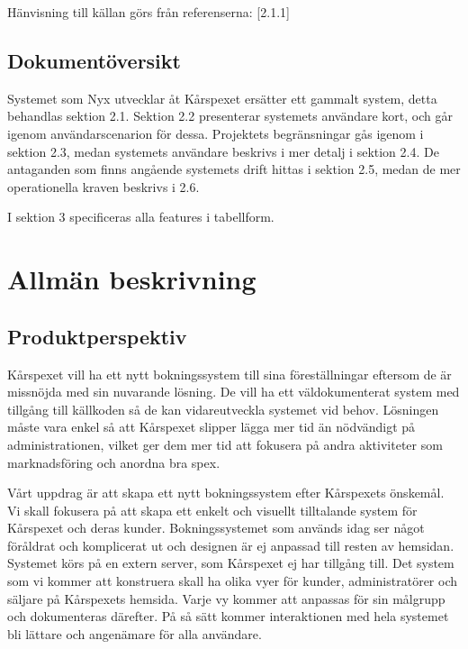 \documentclass[a4paper, twoside, 11pt, titlepage]{article}
\begin{document}
		Hänvisning till källan görs från referenserna: [2.1.1]

	\subsection{Dokumentöversikt}


	Systemet som Nyx utvecklar åt Kårspexet ersätter ett gammalt system, detta behandlas sektion 2.1. Sektion 2.2 presenterar systemets användare kort, och går igenom användarscenarion för dessa. Projektets begränsningar gås igenom i sektion 2.3, medan systemets användare beskrivs i mer detalj i sektion 2.4. De antaganden som finns angående systemets drift hittas i sektion 2.5, medan de mer operationella kraven beskrivs i 2.6.

	I sektion 3 specificeras alla features i tabellform.

\clearpage
	\section{Allmän beskrivning}



	\subsection{Produktperspektiv}


	Kårspexet vill ha ett nytt bokningssystem till sina föreställningar eftersom de är missnöjda med sin nuvarande lösning. De vill ha ett väldokumenterat system med tillgång till källkoden så de kan vidareutveckla systemet vid behov. Lösningen måste vara enkel så att Kårspexet slipper lägga mer tid än nödvändigt på administrationen, vilket ger dem mer tid att fokusera på andra aktiviteter som marknadsföring och anordna bra spex.

	Vårt uppdrag är att skapa ett nytt bokningssystem efter Kårspexets önskemål. Vi skall fokusera på att skapa ett enkelt och visuellt tilltalande system för Kårspexet och deras kunder. Bokningssystemet som används idag ser något föråldrat och komplicerat ut och designen är ej anpassad till resten av hemsidan. Systemet körs på en extern server, som Kårspexet ej har tillgång till. Det system som vi kommer att konstruera skall ha olika vyer för kunder, administratörer och säljare på Kårspexets hemsida. Varje vy kommer att anpassas för sin målgrupp och dokumenteras därefter. På så sätt kommer interaktionen med hela systemet bli lättare och angenämare för alla användare.
\end{document}

